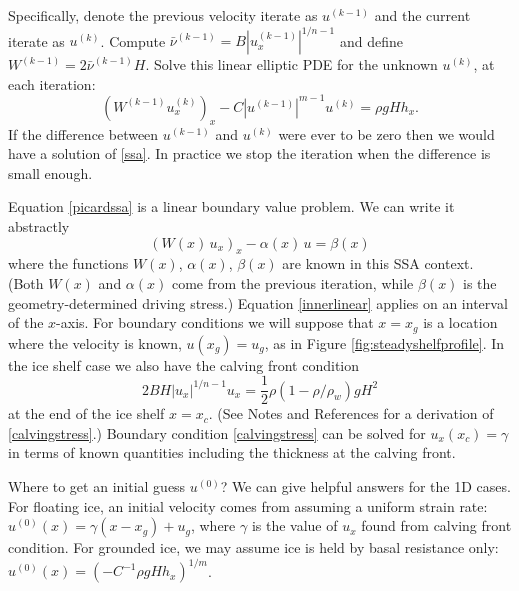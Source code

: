 \documentclass[titlepage,a4paper,final,12pt]{scrartcl}
\begin{document}
Specifically, denote the previous velocity iterate as $u^{(k-1)}$ and the current iterate as $u^{(k)}$.  Compute $\bar \nu^{(k-1)} = B |u^{(k-1)}_x|^{1/n-1}$ and define $W^{(k-1)} = 2 \bar \nu^{(k-1)} H$.  Solve this linear elliptic PDE for the unknown $u^{(k)}$, at each iteration:
\begin{equation}
   \left(W^{(k-1)} u^{(k)}_x\right)_x - C |u^{(k-1)}|^{m-1} u^{(k)} = \rho g H h_x. \label{picardssa}
\end{equation}
If the difference between $u^{(k-1)}$ and $u^{(k)}$ were ever to be zero then we would have a solution of \eqref{ssa}.  In practice we stop the iteration when the difference is small enough.

Equation \eqref{picardssa} is a linear boundary value problem.  We can write it abstractly
\begin{equation}
  \left(W(x)\, u_x\right)_x - \alpha(x)\, u = \beta(x)  \label{innerlinear}
\end{equation}
where the functions $W(x)$, $\alpha(x)$, $\beta(x)$ are known in this SSA context.  (Both $W(x)$ and $\alpha(x)$ come from the previous iteration, while $\beta(x)$ is the geometry-determined driving stress.)  Equation \eqref{innerlinear} applies on an interval of the $x$-axis.  For boundary conditions we will suppose that $x=x_g$ is a location where the velocity is known, $u(x_g)=u_g$, as in Figure \ref{fig:steadyshelfprofile}.  In the ice shelf case we also have the calving front condition
\begin{equation}
  2 B H |u_x|^{1/n - 1} u_x = \frac{1}{2}\rho (1-\rho/\rho_w) g H^2  \label{calvingstress}
\end{equation}
at the end of the ice shelf $x=x_c$.  (See Notes and References for a derivation of \eqref{calvingstress}.)  Boundary condition \eqref{calvingstress} can be solved for $u_x(x_c)=\gamma$ in terms of known quantities including the thickness at the calving front.

Where to get an initial guess $u^{(0)}$?  We can give helpful answers for the 1D cases.  For floating ice, an initial velocity comes from assuming a uniform strain rate: $u^{(0)}(x) = \gamma (x-x_g) + u_g$, where $\gamma$ is the value of $u_x$ found from calving front condition.  For grounded ice, we may assume ice is held by basal resistance only: $u^{(0)}(x) = \left(-C^{-1} \rho g H h_x\right)^{1/m}$.
\end{document}
